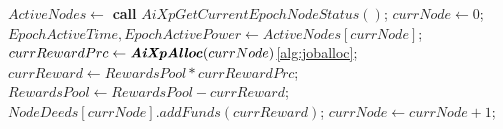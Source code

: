 \documentclass{article}
\begin{document}
\begin{algorithm}
\begin{algorithmic}[1]
            \EndWhile\vspace{1mm}
        \EndWhile\vspace{1mm}
        \State $ActiveNodes \gets$ \textbf{call} $AiXpGetCurrentEpochNodeStatus()$;\vspace{1mm}
        \State $currNode \gets 0$;\vspace{1mm}
        \; \vspace{1mm}
            \State $EpochActiveTime, EpochActivePower \gets ActiveNodes[currNode]$;\vspace{1mm}
            \State $currRewardPrc \gets \textbf{\textit{AiXpAlloc}}(currNode)$\ref{alg:joballoc};\vspace{1mm}
            \State $currReward \gets RewardsPool * currRewardPrc$;\vspace{1mm}
            \State $RewardsPool \gets RewardsPool - currReward$;\vspace{1mm}
            \State $NodeDeeds[currNode].addFunds(currReward)$;\vspace{1mm}
            \State $currNode \gets currNode + 1$;\vspace{1mm}
        \EndWhile
    \EndWhile\vspace{1mm}
\end{algorithmic}
\end{algorithm}
\end{document}
